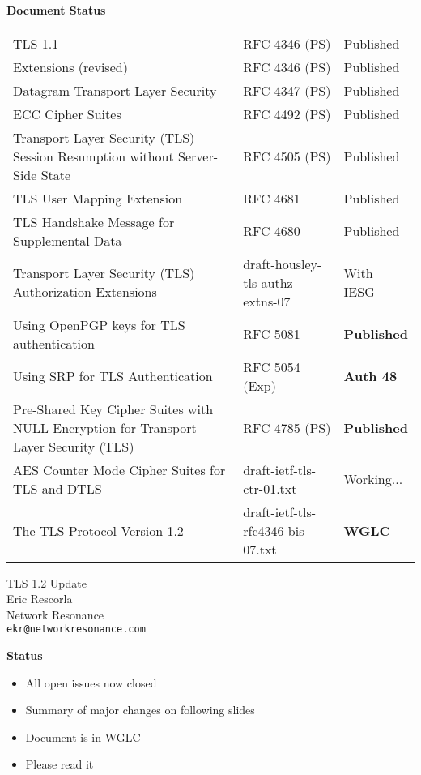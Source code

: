 \documentclass[helvetica]{seminar}
\newcommand{\heading}[1]{%
  \begin{center} 
    \large\bf 
    #1 
  \end{center} 
  \vspace{.4 in}}
\begin{document}
\begin{slide}
\heading{Document Status}

{\tiny
\begin{tabular}{|p{1.5 in}|p{1.4 in}|p{.7 in}|}
\hline
TLS 1.1 & RFC 4346 (PS) & Published \\
Extensions (revised) & RFC 4346 (PS) & Published \\
Datagram Transport Layer Security & RFC 4347 (PS) & Published \\
ECC Cipher Suites & RFC 4492 (PS) & Published \\
Transport Layer Security (TLS) Session Resumption without
Server-Side State & RFC 4505 (PS) & Published \\
TLS User Mapping Extension & RFC 4681 & Published \\
TLS Handshake Message for Supplemental Data & RFC 4680 & Published \\
Transport Layer Security (TLS) Authorization Extensions & draft-housley-tls-authz-extns-07 & With IESG \\
Using OpenPGP keys for TLS authentication & RFC 5081 & \textbf{Published} \\
Using SRP for TLS Authentication & RFC 5054 (Exp) & \textbf{Auth 48} \\
Pre-Shared Key Cipher Suites with NULL Encryption for Transport Layer Security (TLS) & RFC 4785  (PS) & \textbf{Published} \\
AES Counter Mode Cipher Suites for TLS and DTLS & draft-ietf-tls-ctr-01.txt & Working... \\
The TLS Protocol Version 1.2 & draft-ietf-tls-rfc4346-bis-07.txt & \textbf{WGLC} \\
\hline
\end{tabular}
}
\end{slide}

        
\begin{slide}
\begin{center}
\LARGE{{\bf}TLS 1.2 Update}\\

\vspace{.3 in}
\large{Eric Rescorla}\\
\large{Network Resonance}\\
\large{\texttt{ekr@networkresonance.com}}

\end{center}
\end{slide}


\begin{slide}
\heading{Status}

\begin{itemize}
\item All open issues now closed
\item Summary of major changes on following slides
\item Document is in WGLC
\item Please read it
\end{itemize}

\end{slide}
\end{document}
